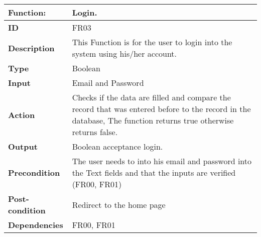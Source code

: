 \documentclass[]{article}
\begin{document}
\FloatBarrier
\begin{table}[h]
\caption{ }
\label{tab:my-table}
\begin{tabular}{|p{}|p{}|}
\hline
\textbf{Function:} & Login.
\\ \hline
\textbf{ID}  &    FR03        

\\ \hline
\textbf{Description}    &       This Function is for the user to login into the system using his/her account.                                                              
\\ \hline
\textbf{Type}    &         Boolean

\\ \hline
\textbf{Input}        & Email and Password


\\ \hline
\textbf{Action}            & Checks if the data are filled and compare the record that was entered before to the record in the database, The function returns true otherwise returns false.

\\ \hline
\textbf{Output}            & Boolean acceptance login.

\\ \hline
\textbf{Precondition}           &   The user needs to into his email and password into the Text fields and that the inputs are verified (FR00, FR01)

\\ \hline
\textbf{Post-condition}           & Redirect to the home page


\\ \hline
\textbf{Dependencies}           & FR00, FR01
\\ \hline
\end{tabular}
\end{table}
\end{document}

